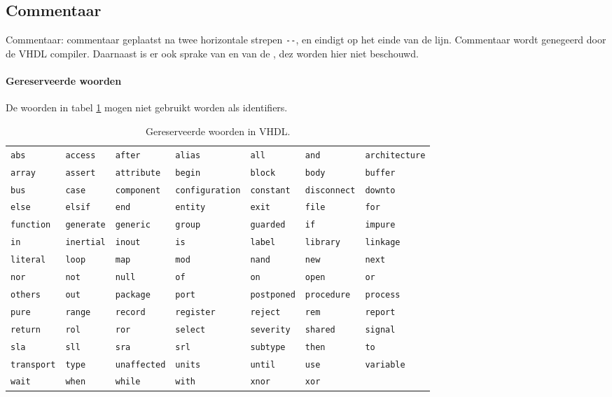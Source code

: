 \subsection{Commentaar}
Commentaar: commentaar geplaatst na twee horizontale strepen \verb+--+, en eindigt op het einde van de lijn. Commentaar wordt genegeerd door de VHDL compiler.
Daarnaast is er ook sprake van  en van de , dez worden hier niet beschouwd.
\paragraph{Gereserveerde woorden}De woorden in tabel \ref{tbl:vHDLReservedWords} mogen niet gebruikt worden als identifiers.
\begin{table}[hbt]
\centering
\small{\begin{tabular}{lllllll}
\verb+abs+&\verb+access+&\verb+after+&\verb+alias+&\verb+all+&\verb+and+&\verb+architecture+\\
\verb+array+&\verb+assert+&\verb+attribute+&\verb+begin+&\verb+block+&\verb+body+&\verb+buffer+\\
\verb+bus+&\verb+case+&\verb+component+&\verb+configuration+&\verb+constant+&\verb+disconnect+&\verb+downto+\\
\verb+else+&\verb+elsif+&\verb+end+&\verb+entity+&\verb+exit+&\verb+file+&\verb+for+\\
\verb+function+&\verb+generate+&\verb+generic+&\verb+group+&\verb+guarded+&\verb+if+&\verb+impure+\\
\verb+in+&\verb+inertial+&\verb+inout+&\verb+is+&\verb+label+&\verb+library+&\verb+linkage+\\
\verb+literal+&\verb+loop+&\verb+map+&\verb+mod+&\verb+nand+&\verb+new+&\verb+next+\\
\verb+nor+&\verb+not+&\verb+null+&\verb+of+&\verb+on+&\verb+open+&\verb+or+\\
\verb+others+&\verb+out+&\verb+package+&\verb+port+&\verb+postponed+&\verb+procedure+&\verb+process+\\
\verb+pure+&\verb+range+&\verb+record+&\verb+register+&\verb+reject+&\verb+rem+&\verb+report+\\
\verb+return+&\verb+rol+&\verb+ror+&\verb+select+&\verb+severity+&\verb+shared+&\verb+signal+\\
\verb+sla+&\verb+sll+&\verb+sra+&\verb+srl+&\verb+subtype+&\verb+then+&\verb+to+\\
\verb+transport+&\verb+type+&\verb+unaffected+&\verb+units+&\verb+until+&\verb+use+&\verb+variable+\\
\verb+wait+&\verb+when+&\verb+while+&\verb+with+&\verb+xnor+&\verb+xor+
\end{tabular}}
\caption{Gereserveerde woorden in VHDL.}
\label{tbl:vHDLReservedWords}
\end{table}
